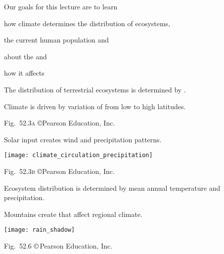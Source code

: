 \documentclass[t]{beamer}
\begin{document}

\begin{frame}{Our goals for this lecture are to learn}

	\hangpara how climate determines the distribution of ecosystems,
	
	\hangpara the current human population and 
	
	\hangpara about the  and
	
	\hangpara how it affects  
	
\end{frame}
%
{
	\begin{frame}[b]{The distribution of terrestrial ecosystems is determined by .}
		
	\end{frame}
}
%


{
	\begin{frame}[b]{Climate is driven by variation of  from low to high latitudes.}
		
		\hfill \tiny Fig.~52.3\textsc{a} \copyright Pearson Education, Inc.
	\end{frame}
}
%
{
	\begin{frame}[t]{Solar input creates wind and precipitation patterns.}
		
		\texttt{[image: climate\_circulation\_precipitation]}
		
		\vfilll
		
		\hfill \tiny Fig.~52.3\textsc{b} \copyright Pearson Education, Inc.
	\end{frame}
}
%


{
	\begin{frame}[b]{Ecosystem distribution is determined by mean annual temperature and precipitation.}
		
	\end{frame}
}
%
\begin{frame}[t]{Mountains create  that affect regional climate.}
	
	\bigskip
	
	\texttt{[image: rain\_shadow]}
	
	\vfilll
	
	\hfill \tiny Fig.~52.6 \copyright\,Pearson Education, Inc.
\end{frame}
%
{
	\begin{frame}[b]
		
	\end{frame}
}
\end{document}
